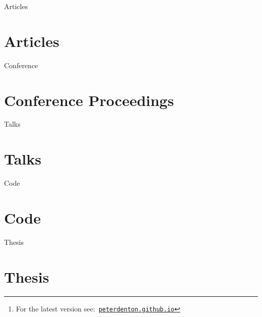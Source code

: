 \documentclass[12pt]{article}
\title{\myTitle}
\author{\myName}
\date{\small Updated: \today\footnote{For the latest version see:\ \href{http://peterdenton.github.io}{\tt peterdenton.github.io}}}
\newcommand\myBib[2]{
	\begin{btSect}{#2}
	\section*{#1}
	\btPrintAll
	\end{btSect}}
\begin{document}
	\makeatletter
	\let\@fnsymbol\@arabic
	\makeatother

	\maketitle

	

	\myBib{Articles}{Articles}
	\myBib{Conference Proceedings}{Conference}
	\myBib{Talks}{Talks}
	\myBib{Code}{Code}
	\myBib{Thesis}{Thesis}

	
\end{document}
